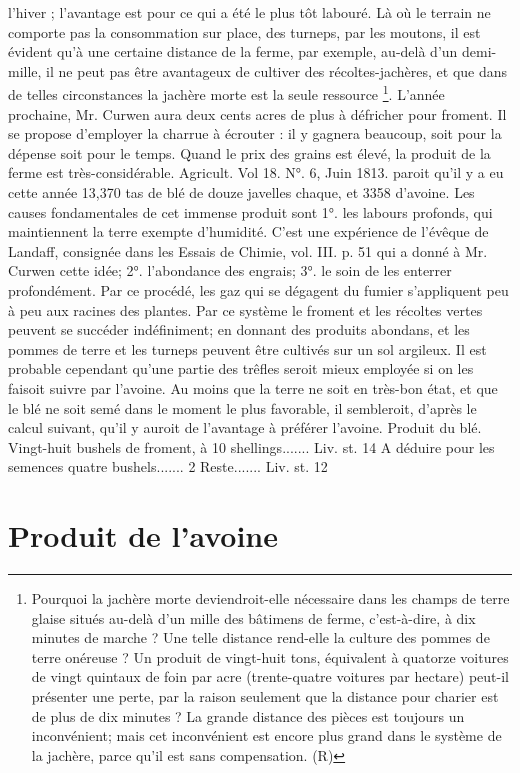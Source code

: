 l'hiver ; l'avantage est pour ce qui a été le plus tôt labouré. Là où le terrain ne comporte pas la consommation sur place, des turneps, par les moutons, il est évident qu'à une certaine distance de la ferme, par exemple, au-delà d'un demi-mille, il ne peut pas être avantageux de cultiver des récoltes-jachères, et que dans de telles circonstances la jachère morte est la seule ressource \footnote{Pourquoi la jachère morte deviendroit-elle nécessaire dans les champs de terre glaise situés au-delà d'un mille des bâtimens de ferme, c'est-à-dire, à dix minutes de marche ? Une telle distance rend-elle la culture des pommes de terre onéreuse ? Un produit de vingt-huit tons, équivalent à quatorze voitures de vingt quintaux de foin par acre (trente-quatre voitures par hectare) peut-il présenter une perte, par la raison seulement que la distance pour charier est de plus de dix minutes ? La grande distance des pièces est toujours un inconvénient; mais cet inconvénient est encore plus grand dans le système de la jachère, parce qu'il est sans compensation. (R)}.
L'année prochaine, Mr. Curwen aura deux cents acres de plus à défricher pour froment. Il se propose d'employer la charrue à écrouter : il y gagnera beaucoup, soit pour la dépense soit pour le temps.
Quand le prix des grains est élevé, la produit de la ferme est très-considérable.
Agricult. Vol 18. N°. 6, Juin 1813.\setcounter{page}{218} paroit qu'il y a eu cette année 13,370 tas de blé de douze javelles chaque, et 3358 d'avoine. Les causes fondamentales de cet immense produit sont 1°. les labours profonds, qui maintiennent la terre exempte d'humidité. C'est une expérience de l'évêque de Landaff, consignée dans les Essais de Chimie, vol. III. p. 51 qui a donné à Mr. Curwen cette idée; 2°. l'abondance des engrais; 3°. le soin de les enterrer profondément. Par ce procédé, les gaz qui se dégagent du fumier s'appliquent peu à peu aux racines des plantes. Par ce système le froment et les récoltes vertes peuvent se succéder indéfiniment; en donnant des produits abondans, et les pommes de terre et les turneps peuvent être cultivés sur un sol argileux.
Il est probable cependant qu'une partie des trêfles seroit mieux employée si on les faisoit suivre par l'avoine. Au moins que la terre ne soit en très-bon état, et que le blé ne soit semé dans le moment le plus favorable, il sembleroit, d'après le calcul suivant, qu'il y auroit de l'avantage à préférer l'avoine.
Produit du blé.
Vingt-huit bushels de froment, à 10 shellings....... Liv. st. 14
A déduire pour les semences quatre bushels....... 2
Reste....... Liv. st. 12\setcounter{page}{219} \section{Produit de l'avoine}
